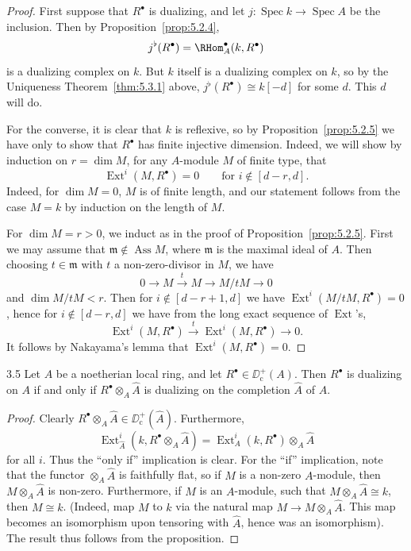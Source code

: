 \begin{proof}
First suppose that $R^\bullet$ is dualizing, and let $j\colon\operatorname{Spec}k\longrightarrow\operatorname{Spec}A$ be the inclusion. Then by Proposition~\ref{prop:5.2.4},
\[
j^{\flat}(R^{\bullet}) = \RHom_A^{\bullet}(k,R^{\bullet})
\]
is a dualizing complex on $k$. But $k$ itself is a dualizing complex on $k$, so by the Uniqueness Theorem~\ref{thm:5.3.1} above, $j^{\flat}(R^{\bullet})\cong k[-d]$ for some $d$. This $d$ will do.

For the converse, it is clear that $k$ is reflexive, so by Proposition~\ref{prop:5.2.5} we have only to show that $R^\bullet$ has finite injective dimension. Indeed, we will show by induction on $r=\dim M$, for any $A$-module $M$ of finite type, that
\[
\operatorname{Ext}^{i}(M,R^{\bullet}) = 0 \qquad\text{for } i\notin[d-r,d].
\]
Indeed, for $\dim M=0$, $M$ is of finite length, and our statement follows from the case $M=k$ by induction on the length of $M$.

For $\dim M=r>0$, we induct as in the proof of Proposition~\ref{prop:5.2.5}. First we may assume that $\mathfrak{m}\notin\operatorname{Ass}M$, where $\mathfrak{m}$ is the maximal ideal of $A$. Then choosing $t\in\mathfrak{m}$ with $t$ a non-zero-divisor in $M$, we have
\[
0\longrightarrow M\xrightarrow{t} M\longrightarrow M/tM\longrightarrow 0
\]
and $\dim M/tM<r$. Then for $i\notin[d-r+1,d]$ we have $\operatorname{Ext}^i(M/tM,R^\bullet)=0$, hence for $i\notin[d-r,d]$ we have from the long exact sequence of $\operatorname{Ext}$'s,
\[
\operatorname{Ext}^{i}(M,R^{\bullet})\xrightarrow{t}\operatorname{Ext}^{i}(M,R^{\bullet})\longrightarrow 0.
\]
It follows by Nakayama's lemma that $\operatorname{Ext}^{i}(M,R^{\bullet})=0$.
\end{proof}

\begin{bookcorollary}{3.5}\label{cor:5.3.5}
Let $A$ be a noetherian local ring, and let $R^\bullet\in\DD^+_{\mathrm{c}}(A)$. Then $R^\bullet$ is dualizing on $A$ if and only if $R^\bullet\otimes_{A}\widehat{A}$ is dualizing on the completion $\widehat{A}$ of $A$.
\end{bookcorollary}

\begin{proof}
Clearly $R^\bullet\otimes_{A}\widehat{A}\in\DD_{\mathrm{c}}^{+}(\widehat{A})$. Furthermore,
\[
\operatorname{Ext}_{\widehat{A}}^{i}(k, R^{\bullet}\otimes_{A}\widehat{A}) = \operatorname{Ext}_{A}^{i}(k, R^{\bullet})\otimes_{A}\widehat{A}
\]
for all $i$. Thus the ``only if'' implication is clear. For the ``if'' implication, note that the functor $\otimes_{A}\widehat{A}$ is faithfully flat, so if $M$ is a non-zero $A$-module, then $M\otimes_{A}\widehat{A}$ is non-zero. Furthermore, if $M$ is an $A$-module, such that $M\otimes_{A}\widehat{A}\cong k$, then $M\cong k$. (Indeed, map $M$ to $k$ via the natural map $M\to M\otimes_{A}\widehat{A}$. This map becomes an isomorphism upon tensoring with $\widehat{A}$, hence was an isomorphism). The result thus follows from the proposition.
\end{proof}


